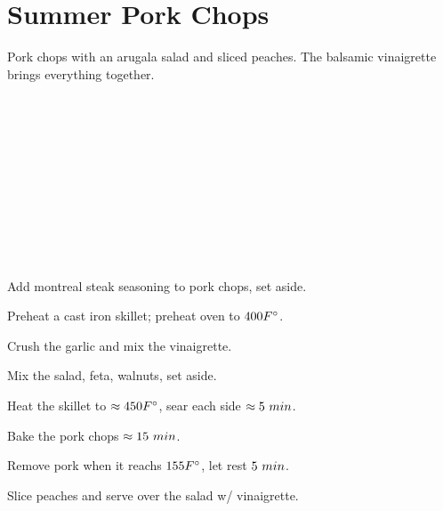 \section{Summer Pork Chops}


\begin{recipestats}[
	servings=2,
	preptime=15 \minute,
	bakingtime=25 \minute,
	source=Mike \& Jane,
	original=\citeauthor{realSimpleSummerPorkchops}~\cite{realSimpleSummerPorkchops},
]
\end{recipestats}


\begin{recipeabstract}
	Pork chops with an arugala salad and sliced peaches.
	The balsamic vinaigrette brings everything together.
\end{recipeabstract}


\begin{ingredientcolumns}
	\begin{ingredientblock}[vinaigrette]
		\\
		\\
		\\
		\\
		\\
	\end{ingredientblock}

	\begin{ingredientblock}
		\\
		\\
		\\
		\\
	\end{ingredientblock}
\end{ingredientcolumns}


\begin{preparation}
	\item Add montreal steak seasoning to pork chops, set aside.
	\item Preheat a cast iron skillet; preheat oven to $400 \Fahrenheit$.
	\item Crush the garlic and mix the vinaigrette.
	\item Mix the salad, feta, walnuts, set aside.
	\item Heat the skillet to $\approx 450 \Fahrenheit$, sear each side $\approx 5~\minute$.
	\item Bake the pork chops $\approx 15~\minute$.
	\item Remove pork when it reachs $155 \Fahrenheit$, let rest $5~\minute$.
	\item Slice peaches and serve over the salad w/ vinaigrette.
\end{preparation}


\recipeend%
